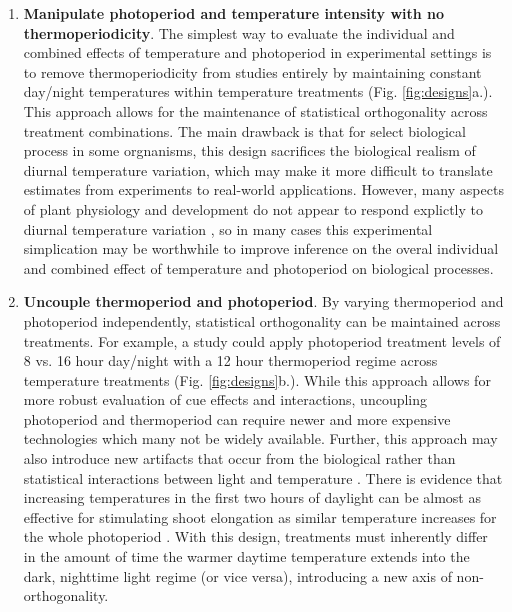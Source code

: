 \documentclass[11pt]{article}
\begin{document}
\begin{enumerate}
\item \textbf{Manipulate photoperiod and temperature intensity with no thermoperiodicity}. The simplest way to evaluate the individual and combined effects of temperature and photoperiod in experimental settings is to remove thermoperiodicity from studies entirely by maintaining constant day/night temperatures within temperature treatments (Fig. \ref{fig:designs}a.). This approach allows for the maintenance of statistical orthogonality across treatment combinations. The main drawback is that for select biological process in some orgnanisms, this design sacrifices the biological realism of diurnal temperature variation, which may make it more difficult to translate estimates from experiments to real-world applications. However, many aspects of plant physiology and development do not appear to respond explictly to diurnal temperature variation \citep[e.g.,][]{Hellmers:1966wz,Warrington:1977vt,Bhatt:2019uu}, so in many cases this experimental simplication may be worthwhile to improve inference on the overal individual and combined effect of temperature and photoperiod on biological processes.

\item \textbf{Uncouple thermoperiod and photoperiod}. By varying thermoperiod and photoperiod independently, statistical orthogonality can be maintained across treatments. For example, a study could apply photoperiod treatment levels of 8 vs. 16 hour day/night with a 12 hour thermoperiod regime across temperature treatments (Fig. \ref{fig:designs}b.). While this approach allows for more robust evaluation of cue effects and interactions, uncoupling photoperiod and thermoperiod can require newer and more expensive technologies which many not be widely available. Further, this approach may also introduce new artifacts that occur from the biological rather than statistical interactions between light and temperature \citep{Chew:2012wj}. There is evidence that increasing temperatures in the first two hours of daylight can be almost as effective for stimulating shoot elongation as similar temperature increases for the whole photoperiod \citep{Erwin1998}. With this design, treatments must inherently differ in the amount of time the warmer daytime temperature extends into the dark, nighttime light regime (or vice versa), introducing a new axis of non-orthogonality.


\end{enumerate}
\end{document}
